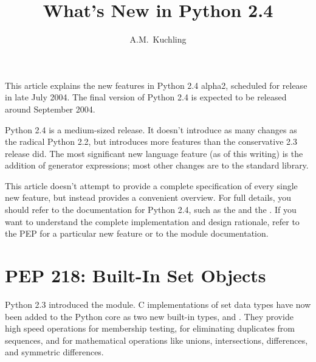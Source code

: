 \documentclass{howto}
\title{What's New in Python 2.4}
\author{A.M.\ Kuchling}
\begin{document}
\maketitle
\tableofcontents

This article explains the new features in Python 2.4 alpha2, scheduled
for release in late July 2004.  The final version of Python 2.4 is
expected to be released around September 2004.

Python 2.4 is a medium-sized release.  It doesn't introduce as many
changes as the radical Python 2.2, but introduces more features than
the conservative 2.3 release did.  The most significant new language
feature (as of this writing) is the addition of generator expressions;
most other changes are to the standard library.

This article doesn't attempt to provide a complete specification of
every single new feature, but instead provides a convenient overview.
For full details, you should refer to the documentation for Python
2.4, such as the 
and the .  If you
want to understand the complete implementation and design rationale,
refer to the PEP for a particular new feature or to the module
documentation.


\section{PEP 218: Built-In Set Objects}

Python 2.3 introduced the  module.  C implementations of
set data types have now been added to the Python core as two new
built-in types,  and
.  They provide high speed
operations for membership testing, for eliminating duplicates from
sequences, and for mathematical operations like unions, intersections,
differences, and symmetric differences.
\end{document}
